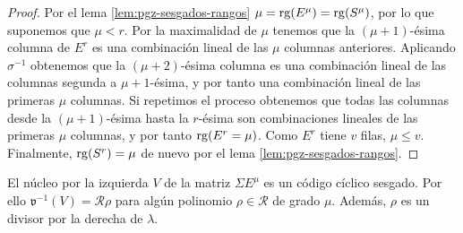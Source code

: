\begin{proof}
  Por el lema \ref{lem:pgz-sesgados-rangos} \(\mu = \operatorname{rg}(E^{\mu}) = \operatorname{rg}(S^{\mu})\), por lo que suponemos que \(\mu < r\).
  Por la maximalidad de \(\mu\) tenemos que la \((\mu + 1)\)-ésima columna de \(E^r\) es una combinación lineal de las \(\mu\) columnas anteriores.
  Aplicando \(\sigma^{-1}\) obtenemos que la \((\mu + 2)\)-ésima columna es una combinación lineal de las columnas segunda a \(\mu + 1\)-ésima, y por tanto una combinación lineal de las primeras \(\mu\) columnas.
  Si repetimos el proceso obtenemos que todas las columnas desde la \((\mu + 1)\)-ésima hasta la \(r\)-ésima son combinaciones lineales de las primeras \(\mu\) columnas, y por tanto \(\operatorname{rg}(E^r = \mu)\).
  Como \(E^r\) tiene \(v\) filas, \(\mu \leq v\).
  Finalmente, \(\operatorname{rg}(S^r) = \mu\) de nuevo por el lema \ref{lem:pgz-sesgados-rangos}.
\end{proof}

\begin{proposition}
  \label{prop:pgz-sesgados-kernel-sesgado}
  El núcleo por la izquierda \(V\) de la matriz \(\Sigma E^{\mu}\) es un código cíclico sesgado.
  Por ello \(\mathfrak v^{-1}(V) = \mathcal R\rho\) para algún polinomio \(\rho \in \mathcal R\) de grado \(\mu\).
  Además, \(\rho\) es un divisor por la derecha de \(\lambda\).
\end{proposition}

